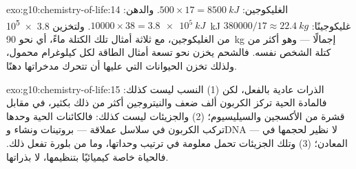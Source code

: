 \begin{solution}{exo:g10:chemistry-of-life:14}
الغليكوجين: $500 \times 17 = \qty{8500}{kJ}$. والدهن: $10000 \times 38 =
\qty{3.8e5}{kJ}$. ولتخزين \qty{3.8e5}{kJ} غليكوجينًا: $380000/17
\approx \qty{22.4}{kg}$ من الغليكوجين، مع ثلاثة أمثال تلك الكتلة ماءً،
أي نحو \qty{90}{kg} إجمالًا --- وهو أكثر من كتلة الشخص نفسه. فالشحم
يخزن نحو تسعة أمثال الطاقة لكل كيلوغرام محمول، ولذلك تخزن الحيوانات
التي عليها أن تتحرك مدخراتها دهنًا.
\end{solution}

\begin{solution}{exo:g10:chemistry-of-life:15}
الذرات عادية بالفعل، لكن (1) النسب ليست كذلك: فالمادة الحية تركز
الكربون ألف ضعف والنيتروجين أكثر من ذلك بكثير، في مقابل قشرة من
الأكسجين والسيليسيوم؛ (2) والجزيئات ليست كذلك: فالكائنات الحية وحدها
تركب الكربون في سلاسل عملاقة --- بروتينات ونشاء وDNA --- لا نظير
لحجمها في المعادن؛ (3) وتلك الجزيئات تحمل معلومة في ترتيب وحداتها،
وما من بلورة تفعل ذلك. فالحياة خاصة كيميائيًا بتنظيمها، لا بذراتها.
\end{solution}

